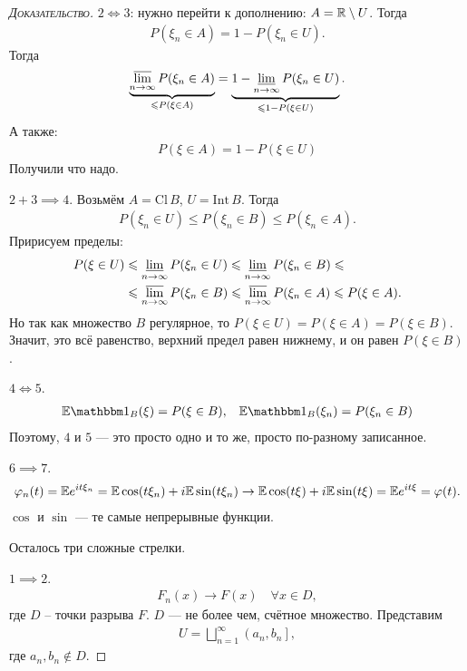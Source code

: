 \documentclass[../main.tex]{subfiles}
\begin{document}
\begin{proof}[\normalfont\textsc{Доказательство}]
 $ 2 \iff 3 $: нужно перейти к дополнению: $ A = \mathbb{R} \setminus U $. Тогда
 \begin{align*}
  P(\xi_n \in A) = 1 - P(\xi_n \in U).
 \end{align*} Тогда
 \begin{align*}
	 \underbrace{\varlimsup_{n \to \infty} P(\xi_n \in A)}_{\leqslant P(\xi \in A)} = \underbrace{1 - \varliminf_{n \to \infty} P(\xi_n \in U)}_{\leqslant 1 - P(\xi \in U)}.
 \end{align*} А также:
 \begin{align*}
  P(\xi \in A) = 1 - P(\xi \in U)
 \end{align*} Получили что надо.

 $ 2 + 3 \implies 4 $. Возьмём $ A = \mathrm{Cl}\,B $, $ U = \mathrm{Int}\,B $. Тогда
 \begin{align*}
  P(\xi_n \in U) \leqslant P(\xi_n \in B) \leqslant P(\xi_n \in A).
 \end{align*} Пририсуем пределы:
 \begin{align*}
  P(\xi \in U) &\leqslant \varliminf_{n \to \infty} P(\xi_n \in U) \leqslant \varliminf_{n \to \infty} P(\xi_n \in B) \leqslant \\
  &\leqslant \varlimsup_{n \to \infty} P(\xi_n \in B) \leqslant \varlimsup_{n \to \infty} P(\xi_n \in A) \leqslant P(\xi \in A).
 \end{align*} Но так как множество $ B $ регулярное, то $ P(\xi \in U) = P(\xi \in A) = P(\xi \in B) $. Значит, это всё равенство, верхний предел равен нижнему, и он равен $ P(\xi \in B) $.

 $ 4 \iff 5 $.
 \begin{align*}
  \E \Ind_B (\xi) = P(\xi \in B), && \E \Ind_B(\xi_n) = P(\xi_n \in B)
 \end{align*} Поэтому, $ 4 $ и $ 5 $ --- это просто одно и то же, просто по-разному записанное.

 $ 6 \implies 7 $.
 \begin{align*}
  \varphi_n(t) = \mathbb E e^{it\xi_n} = \mathbb E \cos(t\xi_n) + i \mathbb E \sin(t\xi_n) \to \mathbb E\cos(t\xi) + i\mathbb E\sin(t\xi) = \mathbb E e^{it\xi} = \varphi(t).
 \end{align*} $ \cos $ и $ \sin $ ---  те самые непрерывные функции.

 Осталось три сложные стрелки.

 $ 1 \implies 2 $.
 \begin{align*}
  F_n(x) \to F(x) \quad \forall x \in D,
 \end{align*} где $ D $ -- точки разрыва $ F $. $ D $ --- не более чем, счётное множество. Представим
 \begin{align*}
  U = \bigsqcup_{n=1}^{\infty} \left(a_n, b_n\right],
 \end{align*} где $ a_n, b_n \notin D $.


\end{proof}
\end{document}
